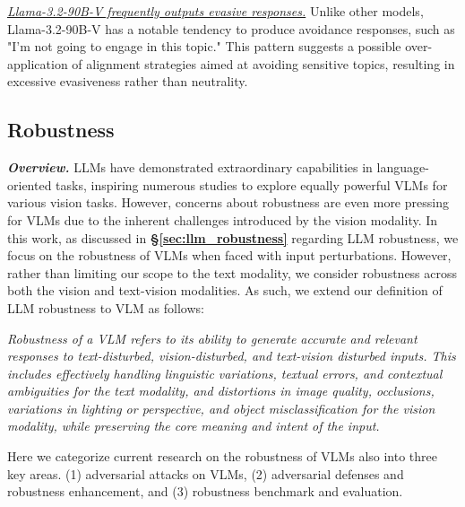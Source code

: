 \textit{\ul{Llama-3.2-90B-V frequently outputs evasive responses.}} Unlike other models, Llama-3.2-90B-V has a notable tendency to produce avoidance responses, such as "I'm not going to engage in this topic." This pattern suggests a possible over-application of alignment strategies aimed at avoiding sensitive topics, resulting in excessive evasiveness rather than neutrality.


\subsection{Robustness}
\textbf{\textit{Overview.}} LLMs have demonstrated extraordinary capabilities in language-oriented tasks, inspiring numerous studies to explore equally powerful VLMs for various vision tasks. However, concerns about robustness are even more pressing for VLMs due to the inherent challenges introduced by the vision modality. In this work, as discussed in \textbf{\S\ref{sec:llm_robustness}} regarding LLM robustness, we focus on the robustness of VLMs when faced with input perturbations. However, rather than limiting our scope to the text modality, we consider robustness across both the vision and text-vision modalities. As such, we extend our definition of LLM robustness to VLM as follows:
\begin{tcolorbox}[definition]
\textit{Robustness of a VLM refers to its ability to generate accurate and relevant responses to text-disturbed, vision-disturbed, and text-vision disturbed inputs. This includes effectively handling linguistic variations, textual errors, and contextual ambiguities for the text modality, and distortions in image quality, occlusions, variations in lighting or perspective, and object misclassification for the vision modality, while preserving the core meaning and intent of the input.}
\end{tcolorbox}

Here we categorize current research on the robustness of VLMs also into three key areas. (1) adversarial attacks on VLMs, (2) adversarial defenses and robustness enhancement, and (3) robustness benchmark and evaluation.

